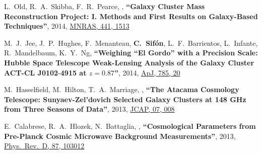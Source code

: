 \documentclass{article}
\def\myself{\textbf{\color{red} C.~Sif\'on}}
\def\apj{ApJ}
\def\jcap{JCAP}
\def\mnras{MNRAS}
\def\prd{Phys.\ Rev.\ D}
\begin{document}
\begin{etaremune}
\item
L.~Old, R.~A.~Skibba, F.~R.~Pearce, ,
\textbf{``Galaxy Cluster Mass Reconstruction Project: I. Methods and First Results on Galaxy-Based 
Techniques''},
2014, \href{http://adsabs.harvard.edu/adsabs/abs/2014MNRAS.441.1513O}{\mnras, 441, 1513}

\item
M.~J.~Jee, J.~P.~Hughes, F.~Menanteau, \myself, L.~F.~Barrientos, L.~Infante, R.~Mandelbaum, 
K.~Y.~Ng,
\textbf{``Weighing ``El Gordo'' with a Precision Scale: Hubble Space Telescope Weak-Lensing Analysis
of the Galaxy Cluster ACT-CL J0102$\textbf{-}$4915 at $z=0.87$''},
2014, \href{http://adsabs.harvard.edu/adsabs/abs/2014ApJ...785...20J}{\apj, 785, 20}

\item
M.~Hasselfield, M.~Hilton, T.~A.~Marriage, ,
\textbf{``The Atacama Cosmology Telescope: Sunyaev-Zel'dovich Selected Galaxy Clusters at 148 GHz from 
Three Seasons of Data''},
2013, \href{http://adsabs.harvard.edu/adsabs/abs/2013arXiv1301.0816H}{\jcap, 07, 008}

\item
E.~Calabrese, R.~A.~Hlozek, N.~Battaglia, ,
\textbf{``Cosmological Parameters from Pre-Planck Cosmic Microwave Background Measurements''},
2013, \href{http://adsabs.harvard.edu/adsabs/abs/2013arXiv1302.1841C}{\prd, 87, 103012}


\end{etaremune}
\end{document}
